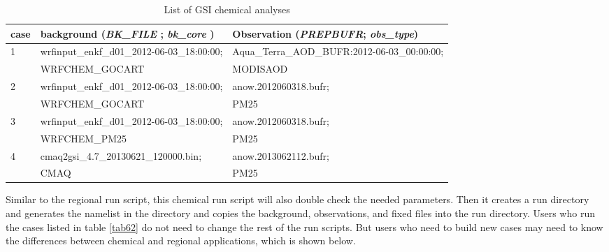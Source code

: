 \begin{table}[htbp]
\centering
\begin{footnotesize}
\caption{List of GSI chemical analyses}
\begin{tabular}{|p{0.7cm}|p{7cm}|p{7cm}|}
\hline
case&background (\textit{BK\_FILE} ; \textit{bk\_core} ) & Observation (\textit{PREPBUFR}; \textit{obs\_type})\\
\hline
1&wrfinput\_enkf\_d01\_2012-06-03\_18:00:00;  & Aqua\_Terra\_AOD\_BUFR:2012-06-03\_00:00:00;  \\
&WRFCHEM\_GOCART &  MODISAOD \\
\hline
2&wrfinput\_enkf\_d01\_2012-06-03\_18:00:00;  & anow.2012060318.bufr; \\
 & WRFCHEM\_GOCART &  PM25\\
\hline
3&wrfinput\_enkf\_d01\_2012-06-03\_18:00:00; & anow.2012060318.bufr; \\
& WRFCHEM\_PM25&  PM25 \\
\hline
4&cmaq2gsi\_4.7\_20130621\_120000.bin;  & anow.2013062112.bufr; \\
& CMAQ & PM25\\
\hline
\end{tabular}
\label{tab63}
\end{footnotesize}
\end{table} 
Similar to the regional run script, this chemical run script will also double check the needed parameters. Then it creates a run directory and generates 
the namelist in the directory and copies the background, observations, and fixed files into the run directory. Users who run the cases listed in table 
\ref{tab62} do not need to change the rest of the run scripts. But users who need to build new cases may need to know the differences between 
chemical and regional applications, which is shown below.  

